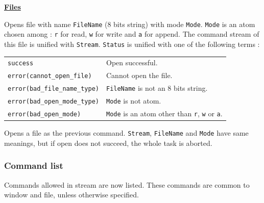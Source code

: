 \noindent\underline{\bf Files}\vspace{1ex}\par
{}
\begin{itemize}

Opens file with name \verb|FileName| (8 bits string) with mode \verb|Mode|.
\verb|Mode| is an atom chosen among : \verb|r| for read, \verb|w| for write and
\verb|a| for append. The command stream of this file is unified
with \verb|Stream|.
\verb|Status| is unified with one of the following terms :
\vspace{1ex}

\hspace*{15mm}\begin{tabular}{l@{ $\cdots$ }l}
\verb|success| & Open successful.\\
\verb|error(cannot_open_file)| & Cannot open the file.\\
\verb|error(bad_file_name_type)| & \verb|FileName| is not an 8 bits string.\\
\verb|error(bad_open_mode_type)| & \verb|Mode| is not atom.\\
\verb|error(bad_open_mode)| & \verb|Mode| is an atom other than \verb|r|,
							\verb|w| or \verb|a|.
\end{tabular}
\vspace{1ex}

Opens a file as the previous command. \verb|Stream|, \verb|FileName| and
\verb|Mode| have same meanings, but if open does not succeed,
the whole task is aborted.

\end{itemize}
\subsubsection{Command list}

Commands allowed in stream are now listed. These commands are common to
window and file, unless otherwise specified.
\vspace{1ex}

